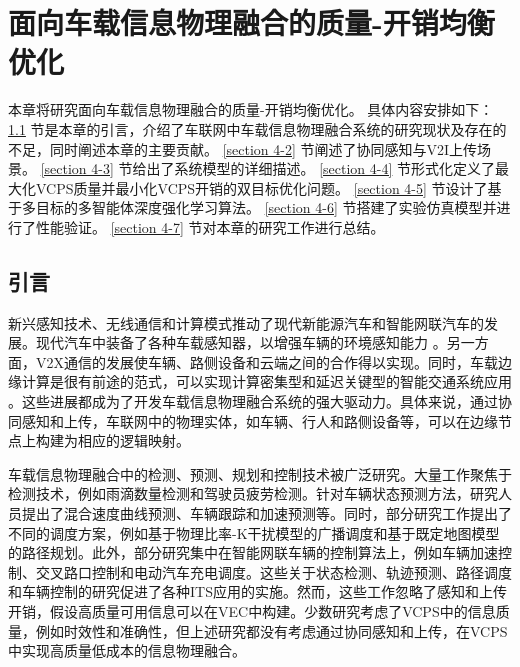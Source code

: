 \chapter[\hspace{0pt}面向车载信息物理融合的质量-开销均衡优化]{{\hspace{-5pt}面向车载信息物理融合的质量-开销均衡优化}}
\removelofgap
\removelotgap
本章将研究面向车载信息物理融合的质量-开销均衡优化。
具体内容安排如下：
\ref{section 4-1} 节是本章的引言，介绍了车联网中车载信息物理融合系统的研究现状及存在的不足，同时阐述本章的主要贡献。
\ref{section 4-2} 节阐述了协同感知与V2I上传场景。
\ref{section 4-3} 节给出了系统模型的详细描述。
\ref{section 4-4} 节形式化定义了最大化VCPS质量并最小化VCPS开销的双目标优化问题。
\ref{section 4-5} 节设计了基于多目标的多智能体深度强化学习算法。
\ref{section 4-6} 节搭建了实验仿真模型并进行了性能验证。
\ref{section 4-7} 节对本章的研究工作进行总结。

\section[\hspace{-2pt}引言]{{ \hspace{-8pt}引言}}\label{section 4-1}

新兴感知技术、无线通信和计算模式推动了现代新能源汽车和智能网联汽车的发展。现代汽车中装备了各种车载感知器，以增强车辆的环境感知能力 \cite{zhu2017overview}。另一方面，V2X通信\cite{chen2020a}的发展使车辆、路侧设备和云端之间的合作得以实现。同时，车载边缘计算\cite{dai2021edge}是很有前途的范式，可以实现计算密集型和延迟关键型的智能交通系统应用 \cite{zhao2022foundation}。这些进展都成为了开发车载信息物理融合系统的强大驱动力。具体来说，通过协同感知和上传，车联网中的物理实体，如车辆、行人和路侧设备等，可以在边缘节点上构建为相应的逻辑映射。

车载信息物理融合中的检测、预测、规划和控制技术被广泛研究。大量工作聚焦于检测技术，例如雨滴数量检测\cite{wang2021deep}和驾驶员疲劳检测\cite{chang2018design}。针对车辆状态预测方法，研究人员提出了混合速度曲线预测\cite{zhang2019a}、车辆跟踪\cite{iepure2021a}和加速预测\cite{zhang2020data}等。同时，部分研究工作提出了不同的调度方案，例如基于物理比率-K干扰模型的广播调度\cite{li2020cyber}和基于既定地图模型的路径规划\cite{lian2021cyber}。此外，部分研究集中在智能网联车辆的控制算法上，例如车辆加速控制\cite{lv2018driving}、交叉路口控制\cite{chang2021an}和电动汽车充电调度\cite{wi2013electric}。这些关于状态检测、轨迹预测、路径调度和车辆控制的研究促进了各种ITS应用的实施。然而，这些工作忽略了感知和上传开销，假设高质量可用信息可以在VEC中构建。少数研究考虑了VCPS中的信息质量，例如时效性\cite{liu2014temporal, dai2019temporal}和准确性\cite{rager2017scalability, yoon2021performance}，但上述研究都没有考虑通过协同感知和上传，在VCPS中实现高质量低成本的信息物理融合。

